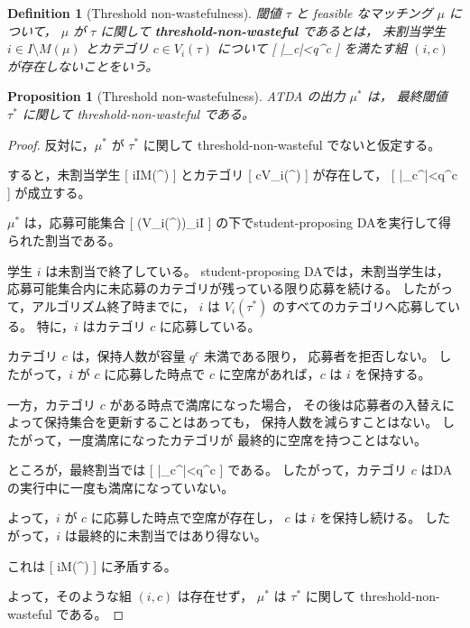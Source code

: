 \documentclass[
  12pt,
  a4paper,
  oneside,
  onecolumn,
  titlepage,
  final
]{jsarticle}
\newtheorem{proposition}{Proposition}
\newtheorem{definition}{Definition}
\newcommand{\1}{\mathbf{1}}
\begin{document}
\begin{definition}[Threshold non-wastefulness]
閾値 $\tau$ と feasible なマッチング $\mu$ について，
$\mu$ が $\tau$ に関して
\textbf{threshold-non-wasteful} であるとは，
未割当学生 $i\in I\setminus M(\mu)$ とカテゴリ
$c\in V_i(\tau)$ について
[
|\mu_c|<q^c
]
を満たす組 $(i,c)$ が存在しないことをいう。
\end{definition}

\begin{proposition}[Threshold non-wastefulness]
\label{prop}
\textsc{ATDA} の出力 $\mu^\ast$ は，
最終閾値 $\tau^\ast$ に関して threshold-non-wasteful である。
\end{proposition}

\begin{proof}
反対に，$\mu^\ast$ が $\tau^\ast$ に関して
threshold-non-wasteful でないと仮定する。

すると，未割当学生
[
i\in I\setminus M(\mu^\ast)
]
とカテゴリ
[
c\in V_i(\tau^\ast)
]
が存在して，
[
|\mu_c^\ast|<q^c
]
が成立する。

$\mu^\ast$ は，応募可能集合
[
(V_i(\tau^\ast))_{i\in I}
]
の下でstudent-proposing DAを実行して得られた割当である。

学生 $i$ は未割当で終了している。
student-proposing DAでは，未割当学生は，
応募可能集合内に未応募のカテゴリが残っている限り応募を続ける。
したがって，アルゴリズム終了時までに，
$i$ は $V_i(\tau^\ast)$ のすべてのカテゴリへ応募している。
特に，$i$ はカテゴリ $c$ に応募している。

カテゴリ $c$ は，保持人数が容量 $q^c$ 未満である限り，
応募者を拒否しない。
したがって，$i$ が $c$ に応募した時点で
$c$ に空席があれば，$c$ は $i$ を保持する。

一方，カテゴリ $c$ がある時点で満席になった場合，
その後は応募者の入替えによって保持集合を更新することはあっても，
保持人数を減らすことはない。
したがって，一度満席になったカテゴリが
最終的に空席を持つことはない。

ところが，最終割当では
[
|\mu_c^\ast|<q^c
]
である。
したがって，カテゴリ $c$ はDAの実行中に一度も満席になっていない。

よって，$i$ が $c$ に応募した時点で空席が存在し，
$c$ は $i$ を保持し続ける。
したがって，$i$ は最終的に未割当ではあり得ない。

これは
[
i\notin M(\mu^\ast)
]
に矛盾する。

よって，そのような組 $(i,c)$ は存在せず，
$\mu^\ast$ は $\tau^\ast$ に関して
threshold-non-wasteful である。
\end{proof}
\end{document}
